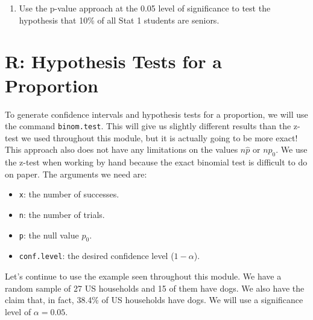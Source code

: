 \documentclass[
]{book}
\providecommand{\tightlist}{%
  \setlength{\itemsep}{0pt}\setlength{\parskip}{0pt}}
\begin{document}
\begin{enumerate}
  \begin{enumerate}
  \def\labelenumii{\alph{enumii}.}
  \tightlist
  \item
    State the null and alternative hypothesis.
  \item
    Find \(\hat{p}\), the sample proportion of freshmen.
  \item
    Determine \(\alpha\) and check assumptions.
  \item
    Compute the test statistic.
  \item
    Use an applet to determine the p-value.
  \item
    What is your conclusion?
  \item
    Interpret your results in the context of the problem.
  \end{enumerate}
\item
  Use the p-value approach at the 0.05 level of significance to test the hypothesis that 10\% of all Stat 1 students are seniors.
\end{enumerate}

\section*{R: Hypothesis Tests for a Proportion}\label{r-hypothesis-tests-for-a-proportion}

To generate confidence intervals and hypothesis tests for a proportion, we will use the command \texttt{binom.test}. This will give us slightly different results than the z-test we used throughout this module, but it is actually going to be more exact! This approach also does not have any limitations on the values \(n\hat{p}\) or \(np_0\). We use the z-test when working by hand because the exact binomial test is difficult to do on paper. The arguments we need are:

\begin{itemize}
\tightlist
\item
  \texttt{x}: the number of successes.
\item
  \texttt{n}: the number of trials.
\item
  \texttt{p}: the null value \(p_0\).
\item
  \texttt{conf.level}: the desired confidence level (\(1-\alpha\)).
\end{itemize}

Let's continue to use the example seen throughout this module. We have a random sample of 27 US households and 15 of them have dogs. We also have the claim that, in fact, 38.4\% of US households have dogs. We will use a significance level of \(\alpha=0.05\).
\end{document}
